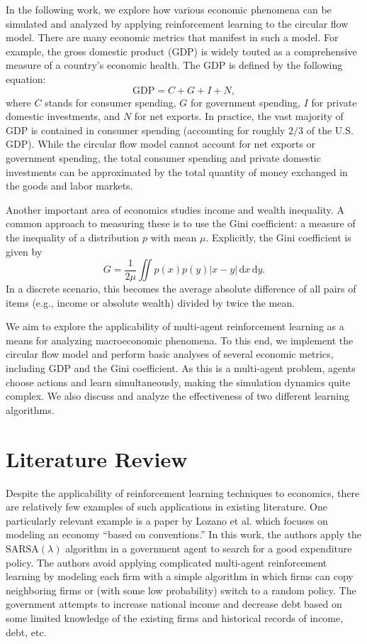 \documentclass[twoside,twocolumn]{article}
\begin{document}
\medskip

In the following work, we explore how various economic phenomena can be simulated and analyzed by applying reinforcement learning to the circular flow model. There are many economic metrics that manifest in such a model. For example, the gross domestic product (GDP) is widely touted as a comprehensive measure of a country's economic health. The GDP is defined by the following equation:
\[
  \text{GDP} = C + G + I + N,
\]
where $C$ stands for consumer spending, $G$ for government spending, $I$ for private domestic investments, and $N$ for net exports. In practice, the vast majority of GDP is contained in consumer spending (accounting for roughly $2/3$ of the U.S. GDP). While the circular flow model cannot account for net exports or government spending, the total consumer spending and private domestic investments can be approximated by the total quantity of money exchanged in the goods and labor markets.

\medskip

Another important area of economics studies income and wealth inequality. A common approach to measuring these is to use the Gini coefficient: a measure of the inequality of a distribution $p$ with mean $\mu$. Explicitly, the Gini coefficient is given by 
\[
  G = \frac{1}{2\mu} \iint p(x)p(y)|x - y|\, \mathrm{d}x\, \mathrm{d}y.
\] 
In a discrete scenario, this becomes the average absolute difference of all pairs of items (e.g., income or absolute wealth) divided by twice the mean.

\medskip 

We aim to explore the applicability of multi-agent reinforcement learning as a means for analyzing macroeconomic phenomena. To this end, we implement the circular flow model and perform basic analyses of several economic metrics, including GDP and the Gini coefficient. As this is a multi-agent problem, agents choose actions and learn simultaneously, making the simulation dynamics quite complex. We also discuss and analyze the effectiveness of two different learning algorithms.


\section{Literature Review}

Despite the applicability of reinforcement learning techniques to economics, there are relatively few examples of such applications in existing literature. One particularly relevant example is a paper by Lozano et al. \cite{RePEc:col:000092:003907} which focuses on modeling an economy ``based on conventions.'' In this work, the authors apply the $\text{SARSA}(\lambda)$ algorithm in a government agent to search for a good expenditure policy. The authors avoid applying complicated multi-agent reinforcement learning by modeling each firm with a simple algorithm in which firms can copy neighboring firms or (with some low probability) switch to a random policy. The government attempts to increase national income and decrease debt based on some limited knowledge of the existing firms and historical records of income, debt, etc. 
\end{document}
